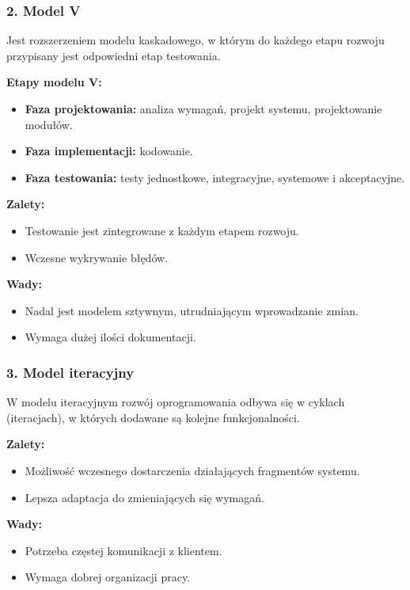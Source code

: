 \subsubsection{2. Model V}
Jest rozszerzeniem modelu kaskadowego, w którym do każdego etapu rozwoju przypisany jest odpowiedni etap testowania.

\textbf{Etapy modelu V:}
\begin{itemize}
    \item \textbf{Faza projektowania:} analiza wymagań, projekt systemu, projektowanie modułów.
    \item \textbf{Faza implementacji:} kodowanie.
    \item \textbf{Faza testowania:} testy jednostkowe, integracyjne, systemowe i akceptacyjne.
\end{itemize}

\textbf{Zalety:}
\begin{itemize}
    \item Testowanie jest zintegrowane z każdym etapem rozwoju.
    \item Wczesne wykrywanie błędów.
\end{itemize}

\textbf{Wady:}
\begin{itemize}
    \item Nadal jest modelem sztywnym, utrudniającym wprowadzanie zmian.
    \item Wymaga dużej ilości dokumentacji.
\end{itemize}

\subsubsection{3. Model iteracyjny}
W modelu iteracyjnym rozwój oprogramowania odbywa się w cyklach (iteracjach), w których dodawane są kolejne funkcjonalności.

\textbf{Zalety:}
\begin{itemize}
    \item Możliwość wczesnego dostarczenia działających fragmentów systemu.
    \item Lepsza adaptacja do zmieniających się wymagań.
\end{itemize}

\textbf{Wady:}
\begin{itemize}
    \item Potrzeba częstej komunikacji z klientem.
    \item Wymaga dobrej organizacji pracy.
\end{itemize}


